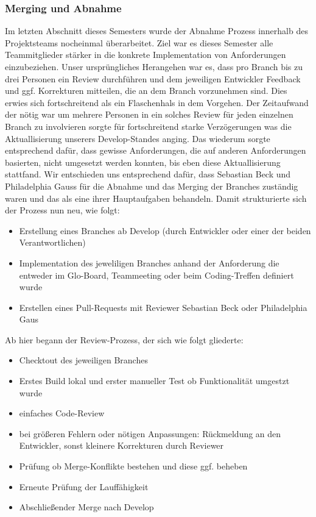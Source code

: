 \subsubsection{Merging und Abnahme}
Im letzten Abschnitt dieses Semesters wurde der Abnahme Prozess innerhalb des Projektsteams nocheinmal überarbeitet.
Ziel war es dieses Semester alle Teammitglieder stärker in die konkrete Implementation von Anforderungen einzubeziehen. Unser ursprüngliches Herangehen war es, dass pro Branch bis zu drei Personen ein Review durchführen und dem jeweiligen Entwickler Feedback und ggf. Korrekturen mitteilen, die an dem Branch vorzunehmen sind. Dies erwies sich fortschreitend als ein Flaschenhals in dem Vorgehen. Der Zeitaufwand der nötig war um mehrere Personen in ein solches Review für jeden einzelnen Branch zu involvieren sorgte für fortschreitend starke Verzögerungen was die Aktuallisierung unserers Develop-Standes anging. Das wiederum sorgte entsprechend dafür, dass gewisse Anforderungen, die auf anderen Anforderungen basierten, nicht umgesetzt werden konnten, bis eben diese Aktuallisierung stattfand. Wir entschieden uns entsprechend dafür, dass Sebastian Beck und Philadelphia Gauss für die Abnahme und das Merging der Branches zuständig waren und das als eine ihrer Hauptaufgaben behandeln. 
Damit strukturierte sich der Prozess nun neu, wie folgt:
\begin{itemize}
\item Erstellung eines Branches ab Develop (durch Entwickler oder einer der beiden Verantwortlichen)
\item Implementation des jeweliligen Branches anhand der Anforderung die entweder im Glo-Board, Teammeeting oder beim Coding-Treffen definiert wurde
\item Erstellen eines Pull-Requests mit Reviewer Sebastian Beck oder Philadelphia Gaus 
\end{itemize}

Ab hier begann der Review-Prozess, der sich wie folgt gliederte:
\begin{itemize}
\item Checktout des jeweiligen Branches
\item Erstes Build lokal und erster manueller Test ob Funktionalität umgestzt wurde
\item einfaches Code-Review
\item bei größeren Fehlern oder nötigen Anpassungen: Rückmeldung an den Entwickler, sonst kleinere Korrekturen durch Reviewer
\item Prüfung ob Merge-Konflikte bestehen und diese ggf. beheben
\item Erneute Prüfung der Lauffähigkeit
\item Abschließender Merge nach Develop
\end{itemize}

